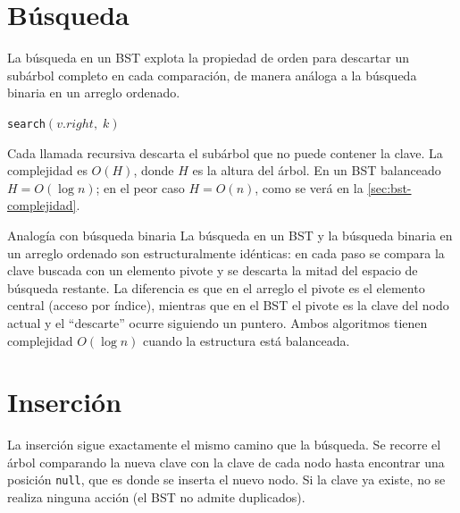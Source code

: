 \section{Búsqueda}
\label{sec:bst-busqueda}

La búsqueda en un BST explota la propiedad de orden para descartar un subárbol completo
en cada comparación, de manera análoga a la búsqueda binaria en un arreglo ordenado.

\begin{algorithm}[H]
\caption{Búsqueda en un BST}
\label{alg:bst-search}
\Return \texttt{search}$(v.\mathit{right},\; k)$\;
\end{algorithm}

Cada llamada recursiva descarta el subárbol que no puede contener la clave. La complejidad
es $O(H)$, donde $H$ es la altura del árbol. En un BST balanceado $H = O(\log n)$; en el
peor caso $H = O(n)$, como se verá en la \cref{sec:bst-complejidad}.

\begin{observacion}{Analogía con búsqueda binaria}
La búsqueda en un BST y la búsqueda binaria en un arreglo ordenado son estructuralmente
idénticas: en cada paso se compara la clave buscada con un elemento pivote y se descarta
la mitad del espacio de búsqueda restante. La diferencia es que en el arreglo el pivote
es el elemento central (acceso por índice), mientras que en el BST el pivote es la clave
del nodo actual y el ``descarte'' ocurre siguiendo un puntero. Ambos algoritmos tienen
complejidad $O(\log n)$ cuando la estructura está balanceada.
\end{observacion}

\section{Inserción}
\label{sec:bst-insercion}

La inserción sigue exactamente el mismo camino que la búsqueda. Se recorre el árbol
comparando la nueva clave con la clave de cada nodo hasta encontrar una posición
\texttt{null}, que es donde se inserta el nuevo nodo. Si la clave ya existe, no se
realiza ninguna acción (el BST no admite duplicados).


